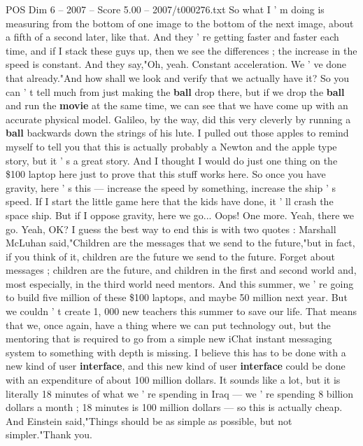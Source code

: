 \begin{textsample}{POS Dim 6 – 2007 – Score 5.00 – 2007/t000276.txt}
So what I ' m doing is measuring from the bottom of one image to the bottom of the next image, about a fifth of a second later, like that.
And they ' re getting faster and faster each time, and if I stack these guys up, then we see the differences ; the increase in the speed is constant.
And they say,"Oh, yeah.
Constant acceleration.
We ' ve done that already."And how shall we look and verify that we actually have it?
So you can ' t tell much from just making the \textbf{ball} drop there, but if we drop the \textbf{ball} and run the \textbf{movie} at the same time, we can see that we have come up with an accurate physical model.
Galileo, by the way, did this very cleverly by running a \textbf{ball} backwards down the strings of his lute.
I pulled out those apples to remind myself to tell you that this is actually probably a Newton and the apple type story, but it ' s a great story.
And I thought I would do just one thing on the \$100 laptop here just to prove that this stuff works here.
So once you have gravity, here ' s this — increase the speed by something, increase the ship ' s speed.
If I start the little game here that the kids have done, it ' ll crash the space ship.
But if I oppose gravity, here we go...
Oops!
One more.
Yeah, there we go.
Yeah, OK?
I guess the best way to end this is with two quotes : Marshall McLuhan said,"Children are the messages that we send to the future,"but in fact, if you think of it, children are the future we send to the future.
Forget about messages ; children are the future, and children in the first and second world and, most especially, in the third world need mentors.
And this summer, we ' re going to build five million of these \$100 laptops, and maybe 50 million next year.
But we couldn ' t create 1, 000 new teachers this summer to save our life.
That means that we, once again, have a thing where we can put technology out, but the mentoring that is required to go from a simple new iChat instant messaging system to something with depth is missing.
I believe this has to be done with a new kind of user \textbf{interface}, and this new kind of user \textbf{interface} could be done with an expenditure of about 100 million dollars.
It sounds like a lot, but it is literally 18 minutes of what we ' re spending in Iraq — we ' re spending 8 billion dollars a month ; 18 minutes is 100 million dollars — so this is actually cheap.
And Einstein said,"Things should be as simple as possible, but not simpler."Thank you.

\end{textsample}
